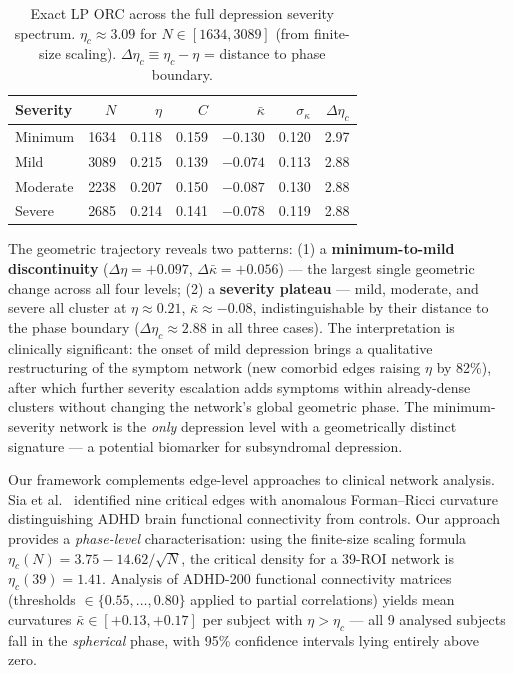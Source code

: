 \documentclass[11pt,a4paper]{article}
\newcommand{\kbar}{\bar{\kappa}}
\newcommand{\etac}{\eta_c}
\begin{document}
\begin{table}[h]
\centering
\small
\caption{Exact LP ORC across the full depression severity spectrum. $\eta_c \approx 3.09$ for $N \in [1634, 3089]$ (from finite-size scaling). $\Delta\eta_c \equiv \eta_c - \eta$ = distance to phase boundary.}
\label{tab:depression_severity}
\begin{tabular}{@{}lrrrrrr@{}}
\toprule
Severity & $N$ & $\eta$ & $C$ & $\kbar$ & $\sigma_\kappa$ & $\Delta\eta_c$ \\
\midrule
Minimum  & 1634 & 0.118 & 0.159 & $-0.130$ & 0.120 & 2.97 \\
Mild     & 3089 & 0.215 & 0.139 & $-0.074$ & 0.113 & 2.88 \\
Moderate & 2238 & 0.207 & 0.150 & $-0.087$ & 0.130 & 2.88 \\
Severe   & 2685 & 0.214 & 0.141 & $-0.078$ & 0.119 & 2.88 \\
\bottomrule
\end{tabular}
\end{table}

The geometric trajectory reveals two patterns: (1) a \textbf{minimum-to-mild discontinuity} ($\Delta\eta=+0.097$, $\Delta\kbar=+0.056$) --- the largest single geometric change across all four levels; (2) a \textbf{severity plateau} --- mild, moderate, and severe all cluster at $\eta \approx 0.21$, $\kbar \approx -0.08$, indistinguishable by their distance to the phase boundary ($\Delta\eta_c \approx 2.88$ in all three cases). The interpretation is clinically significant: the onset of mild depression brings a qualitative restructuring of the symptom network (new comorbid edges raising $\eta$ by 82\%), after which further severity escalation adds symptoms within already-dense clusters without changing the network's global geometric phase. The minimum-severity network is the \emph{only} depression level with a geometrically distinct signature --- a potential biomarker for subsyndromal depression.

Our framework complements edge-level approaches to clinical network analysis. Sia et al.~\cite{sia2021forman} identified nine critical edges with anomalous Forman--Ricci curvature distinguishing ADHD brain functional connectivity from controls. Our approach provides a \emph{phase-level} characterisation: using the finite-size scaling formula $\etac(N) = 3.75 - 14.62/\sqrt{N}$, the critical density for a 39-ROI network is $\etac(39) = 1.41$. Analysis of ADHD-200 functional connectivity matrices (thresholds $\in\{0.55,\ldots,0.80\}$ applied to partial correlations) yields mean curvatures $\kbar \in [+0.13, +0.17]$ per subject with $\eta > \etac$ --- all 9 analysed subjects fall in the \emph{spherical} phase, with 95\% confidence intervals lying entirely above zero.
\end{document}

